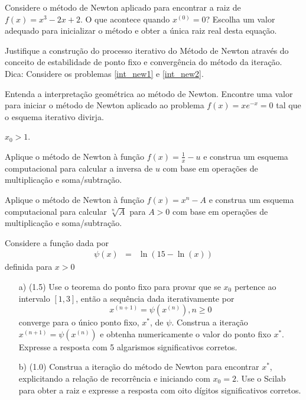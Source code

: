 \begin{Exercise}Considere o método de Newton aplicado para encontrar a raiz de $f(x)=x^3-2x+2$. O que acontece quando $x^{(0)}=0$? Escolha um valor adequado para inicializar o método e obter a única raiz real desta equação.
\end{Exercise}

\begin{Exercise} Justifique a construção do processo iterativo do Método de Newton através do conceito de estabilidade de ponto fixo e convergência do método da iteração. Dica: Considere os problemas \ref{int_new1} e \ref{int_new2}.
\end{Exercise}

\begin{Exercise} Entenda a interpretação geométrica ao método de Newton. Encontre uma valor para iniciar o método de Newton aplicado ao problema $f(x)=xe^{-x}=0$ tal que o esquema iterativo divirja.
\end{Exercise}
\begin{Answer}
  \begin{tiny}
$x_0>1$.    
  \end{tiny}
\end{Answer}

\begin{Exercise}[title= Computação]Aplique o método de Newton à função $f(x)=\frac{1}{x}-u$ e construa um esquema computacional para calcular a inversa de $u$ com base em operações de multiplicação e soma/subtração.
 \end{Exercise}

\begin{Exercise}[title=Computação]Aplique o método de Newton à função $f(x)=x^n-A$ e construa um esquema computacional para calcular  $\sqrt[n]{A}$ para $A>0$ com base em operações de multiplicação e soma/subtração.
\end{Exercise}

\begin{Exercise} Considere a função dada por
\begin{eqnarray*}
\psi(x)&=&\ln\left(15-\ln(x)\right)
\end{eqnarray*}
definida para $x>0$
\begin{itemize}
\item [a)] (1.5) Use o teorema do ponto fixo para provar que se $x_0$ pertence ao intervalo $[1,3]$, então a sequência dada iterativamente por $$x^{(n+1)}=\psi(x^{(n)}),n\geq 0$$ converge para o único ponto fixo, $x^*$, de $\psi$. Construa a iteração $x^{(n+1)}=\psi(x^{(n)})$ e obtenha numericamente o valor do ponto fixo $x^*$. Expresse a resposta com 5 algarismos significativos corretos.
\item [b)] (1.0) Construa a iteração do método de Newton para encontrar $x^*$, explicitando a relação de recorrência e iniciando com $x_0=2$. Use o Scilab para obter a raiz e expresse a resposta com oito dígitos significativos corretos.
\end{itemize}
\end{Exercise}


